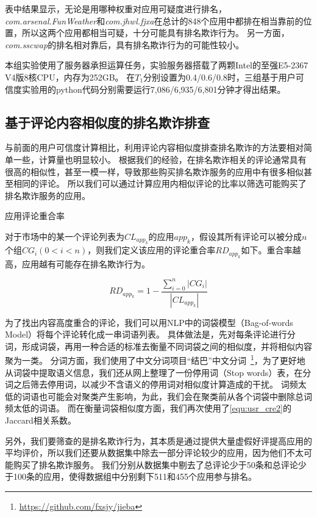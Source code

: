 表中结果显示，无论是用哪种权重对应用可疑度进行排名，\emph{com.arsenal.FunWeather}和\emph{com.jhwl.fjxa}在总计的848个应用中都排在相当靠前的位置，所以这两个应用都相当可疑，十分可能具有排名欺诈行为。
另一方面，\emph{com.sscwap}的排名相对靠后，具有排名欺诈行为的可能性较小。

本组实验使用了服务器承担运算任务，实验服务器搭载了两颗Intel的至强E5-2367 V4版8核CPU，内存为252GB。
在$T_1$分别设置为0.4/0.6/0.8时，三组基于用户可信度实验用的python代码分别需要运行7,086/6,935/6,801分钟才得出结果。

\subsection{基于评论内容相似度的排名欺诈排查}
与前面的用户可信度计算相比，利用评论内容相似度排查排名欺诈的方法要相对简单一些，计算量也明显较小。
根据我们的经验，在排名欺诈相关的评论通常具有很高的相似性，甚至一模一样，导致那些购买排名欺诈服务的应用中有很多相似甚至相同的评论。
所以我们可以通过计算应用内相似评论的比率以筛选可能购买了排名欺诈服务的应用。

\begin{Def}
	应用评论重合率

	对于市场中的某一个评论列表为$CL_{app_k}$的应用$app_k$，假设其所有评论可以被分成$n$个组$CG_i (0 <i < n)$，则我们定义该应用的评论重合率$RD_{app_k}$如下。重合率越高，应用越有可能存在排名欺诈行为。
\end{Def}

\begin{equation}
	RD_{app_k} = 1 - \frac{\sum_{i=0}^n|CG_i|}{|CL_{app_k}|}
	\label{equ:cmt_simi1}
\end{equation}
\vspace{0.5mm}

为了找出内容高度重合的评论，我们可以用NLP中的词袋模型（Bag-of-words Model）将每个评论转化成一串词语列表。
具体做法是，先对每条评论进行分词，形成词袋，再用一种合适的标准去衡量不同词袋之间的相似度，并将相似内容聚为一类。
分词方面，我们使用了中文分词项目“结巴”中文分词~\footnote{\url{https://github.com/fxsjy/jieba}}，为了更好地从词袋中提取语义信息，我们还从网上整理了一份停用词（Stop words）表，在分词之后筛去停用词，以减少不含语义的停用词对相似度计算造成的干扰。
词频太低的词语也可能会对聚类产生影响，为此，我们会在聚类前从各个词袋中删除总词频太低的词语。
而在衡量词袋相似度方面，我们再次使用了\autoref{equ:usr_cre2}的Jaccard相关系数。

另外，我们要筛查的是排名欺诈行为，其本质是通过提供大量虚假好评提高应用的平均评价，所以我们还要从数据集中除去一部分评论较少的应用，因为他们不太可能购买了排名欺诈服务。
我们分别从数据集中剔去了总评论少于50条和总评论少于100条的应用，使得数据组中分别剩下511和455个应用参与排名。

